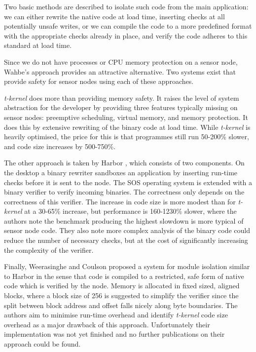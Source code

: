 Two basic methods are described to isolate such code from the main application: we can either rewrite the native code at load time, inserting checks at all potentially unsafe writes, or we can compile the code to a more predefined format with the appropriate checks already in place, and verify the code adheres to this standard at load time.

Since we do not have processes or CPU memory protection on a sensor node, Wahbe's approach provides an attractive alternative. Two systems exist that provide safety for sensor nodes using each of these approaches.

\emph{t-kernel} does more than providing memory safety. It raises the level of system abstraction for the developer by providing three features typically missing on sensor nodes: preemptive scheduling, virtual memory, and memory protection. It does this by extensive rewriting of the binary code at load time. While \emph{t-kernel} is heavily optimised, the price for this is that programmes still run 50-200\% slower, and code size increases by 500-750\%.

The other approach is taken by Harbor \cite{Kumar:2007ge}, which consists of two components. On the desktop a binary rewriter sandboxes an application by inserting run-time checks before it is sent to the node. The SOS operating system \cite{Han:2005th} is extended with a binary verifier to verify incoming binaries. The correctness only depends on the correctness of this verifier. The increase in code size is more modest than for \emph{t-kernel} at a 30-65\% increase, but performance is 160-1230\% slower, where the authors note the benchmark producing the highest slowdown is more typical of sensor node code. They also note more complex analysis of the binary code could reduce the number of necessary checks, but at the cost of significantly increasing the complexity of the verifier.

Finally, Weerasinghe and Coulson \cite{Weerasinghe:2008kh} proposed a system for module isolation similar to Harbor in the sense that code is compiled to a restricted, safe form of native code which is verified by the node. Memory is allocated in fixed sized, aligned blocks, where a block size of 256 is suggested to simplify the verifier since the split between block address and offset falls nicely along byte boundaries. The authors aim to minimise run-time overhead and identify \emph{t-kernel} code size overhead as a major drawback of this approach. Unfortunately their implementation was not yet finished and no further publications on their approach could be found.
